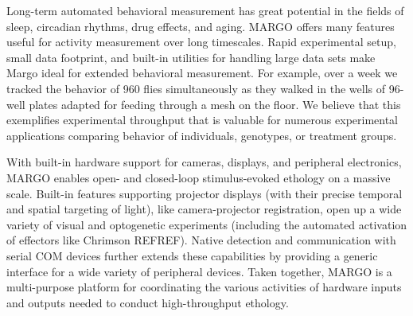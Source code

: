 \documentclass[10pt]{article}
\begin{document}
\begin{multicols}{2}
Long-term automated behavioral measurement has great potential in the fields of sleep, circadian rhythms, drug effects, and aging. MARGO offers many features useful for activity measurement over long timescales. Rapid experimental setup, small data footprint, and built-in utilities for handling large data sets make Margo ideal for extended behavioral measurement. For example, over a week we tracked the behavior of 960 flies simultaneously as they walked in the wells of 96-well plates adapted for feeding through a mesh on the floor. We believe that this exemplifies experimental throughput that is valuable for numerous experimental applications comparing behavior of individuals, genotypes, or treatment groups.  

With built-in hardware support for cameras, displays, and peripheral electronics, MARGO enables open- and closed-loop stimulus-evoked ethology on a massive scale. Built-in features supporting projector displays (with their precise temporal and spatial targeting of light), like camera-projector registration, open up a wide variety of visual and optogenetic experiments (including the automated activation of effectors like Chrimson REFREF). Native detection and communication with serial COM devices further extends these capabilities by providing a generic interface for a wide variety of peripheral devices. Taken together, MARGO is a multi-purpose platform for coordinating the various activities of hardware inputs and outputs needed to conduct high-throughput ethology. 


\end{multicols}
\end{document}
